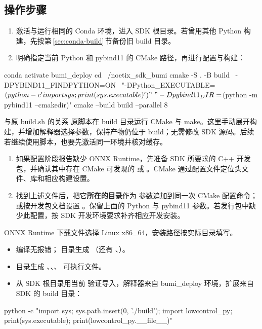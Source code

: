 \subsection*{操作步骤}
\begin{enumerate}
\item 激活与运行相同的 Conda 环境，进入 SDK 根目录。若曾用其他 Python 构建，先按第\,\ref{sec:conda-build}\,节备份旧 build 目录。
\item 明确指定当前 Python 和 pybind11 的 CMake 路径，再进行配置与构建：
\end{enumerate}
\begin{command}
conda activate bumi_deploy
cd ~/noetix_sdk_bumi
cmake -S . -B build \
  -DPYBIND11_FINDPYTHON=ON \
  "-DPython_EXECUTABLE=$(python -c 'import sys; print(sys.executable)')" \
  "-Dpybind11_DIR=$(python -m pybind11 --cmakedir)"
cmake --build build --parallel 8
\end{command}
\begin{remark}{与原 build.sh 的关系}
原脚本在 build 目录运行 CMake 与 make。这里手动展开构建，并增加解释器选择参数，保持产物仍位于 build；无需修改 SDK 源码。后续若继续使用脚本，也要先激活同一环境并核对缓存。
\end{remark}
\begin{enumerate}[resume]
\item 如果配置阶段报告缺少 ONNX Runtime，先准备 SDK 所要求的 C++ 开发包，并确认其中存在 CMake 可发现的 \code{onnxruntimeConfig.cmake} 或 。CMake 通过配置文件定位头文件、库和相应构建设置。
\item 找到上述文件后，把它\textbf{所在的目录}作为  参数追加到同一次 CMake 配置命令；或按开发包文档设置 。保留上面的 Python 与 pybind11 参数。若发行包中缺少此配置，按 SDK 开发环境要求补齐相应开发安装。
\end{enumerate}
ONNX Runtime 下载文件选择 Linux x86\_64，安装路径按实际目录填写。

\begin{expected}
\begin{itemize}
\item 编译无报错； 目录生成 （还有 、）。
\item {} 目录生成 、、、 可执行文件。
\item 从 SDK 根目录用当前  验证导入，解释器来自 bumi\_deploy 环境，扩展来自 SDK 的 build 目录：

\end{itemize}
\end{expected}
\begin{command}
python -c "import sys; sys.path.insert(0, './build'); import lowcontrol_py; print(sys.executable); print(lowcontrol_py.__file__)"
\end{command}
